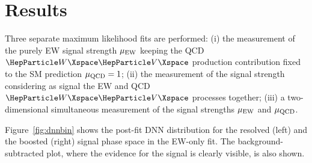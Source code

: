 \section{Results} \label{sec:8}
Three separate maximum likelihood fits are performed: (i) the measurement of the purely EW signal strength $\mu_{\mathrm{EW}}$ keeping
the QCD $\PW\PV$ production contribution fixed to the SM prediction $\mu_{\mathrm{QCD}}=1$; (ii) the measurement of the signal strength
considering as signal the EW and QCD $\PW\PV$ processes together; (iii) a two-dimensional simultaneous measurement of the
signal strengths $\mu_{\mathrm{EW}}$ and $\mu_{\mathrm{QCD}}$.

Figure~\ref{fig:dnnbin} shows the post-fit DNN distribution for the resolved (left) and the boosted (right) signal phase
space in the EW-only fit. The background-subtracted plot, where the evidence for the signal is clearly visible, is also
shown.

